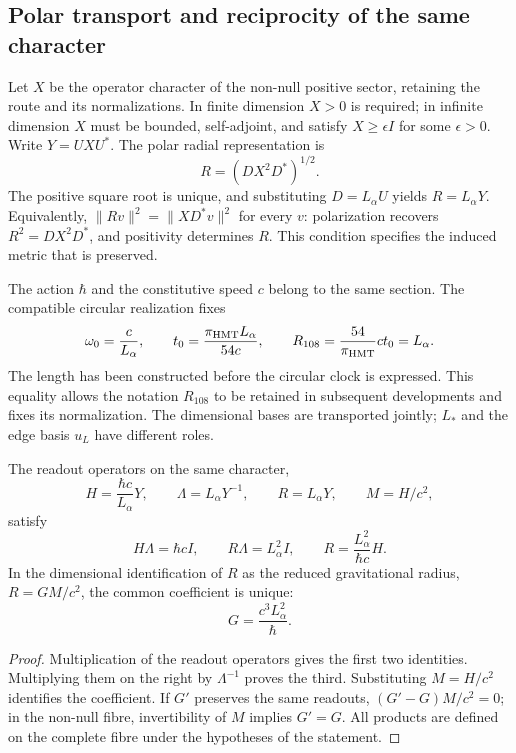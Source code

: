 \subsection{Polar transport and reciprocity of the same character}
\label{md:rigidez:polar}

Let $X$ be the operator character of the non-null positive sector,
retaining the route and its normalizations. In finite dimension $X>0$
is required; in infinite dimension $X$ must be bounded, self-adjoint,
and satisfy $X\ge\epsilon I$ for some $\epsilon>0$. Write $Y=UXU^*$.
The polar radial representation is
\[
 R=(DX^2D^*)^{1/2}.
\]
The positive square root is unique, and substituting $D=L_\alpha U$
yields $R=L_\alpha Y$. Equivalently,
$\|Rv\|^2=\|XD^*v\|^2$ for every $v$: polarization recovers
$R^2=DX^2D^*$, and positivity determines $R$. This condition specifies
the induced metric that is preserved.

The action $\hbar$ and the constitutive speed $c$ belong to the same
section. The compatible circular realization fixes
\begin{equation}
 \omega_0=\frac{c}{L_\alpha},\qquad
 t_0=\frac{\pi_{\rm HMT}L_\alpha}{54c},\qquad
 R_{108}=\frac{54}{\pi_{\rm HMT}}ct_0=L_\alpha.
 \label{md:rigidez:reloj}
\end{equation}
The length has been constructed before the circular clock is expressed.
This equality allows the notation $R_{108}$ to be retained in subsequent
developments and fixes its normalization. The dimensional bases are
transported jointly; $L_*$ and the edge basis $u_L$ have different roles.

\begin{theorem}
\label{md:rigidez:teorema}
The readout operators on the same character,
\[
 H=\frac{\hbar c}{L_\alpha}Y,\qquad
 \Lambda=L_\alpha Y^{-1},\qquad R=L_\alpha Y,\qquad M=H/c^2,
\]
satisfy
\begin{equation}
 H\Lambda=\hbar cI,\qquad R\Lambda=L_\alpha^2I,\qquad
 R=\frac{L_\alpha^2}{\hbar c}H.
 \label{md:rigidez:identidades}
\end{equation}
In the dimensional identification of $R$ as the reduced gravitational
radius, $R=GM/c^2$, the common coefficient is unique:
\begin{equation}
 \boxed{G=\frac{c^3L_\alpha^2}{\hbar}.}
 \label{md:rigidez:G}
\end{equation}
\end{theorem}
\begin{proof}
Multiplication of the readout operators gives the first two identities.
Multiplying them on the right by $\Lambda^{-1}$ proves the third.
Substituting $M=H/c^2$ identifies the coefficient. If $G'$ preserves
the same readouts, $(G'-G)M/c^2=0$; in the non-null fibre,
invertibility of $M$ implies $G'=G$.
All products are defined on the complete fibre under the hypotheses
of the statement.
\end{proof}

